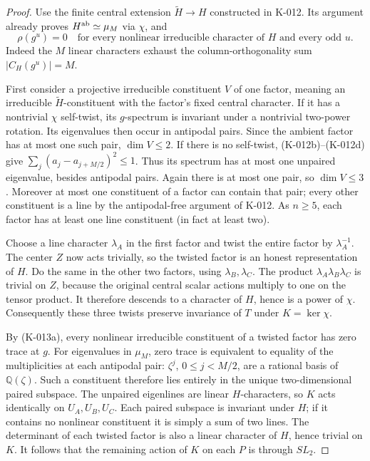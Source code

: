 \begin{proof}
Use the finite central extension $\widetilde H\to H$ constructed in
K-012.  Its argument already proves $H^{\rm ab}\simeq\mu_M$ via
$\chi$, and
\[
 \rho(g^u)=0\quad\text{for every nonlinear irreducible character
 of }H\text{ and every odd }u.                              \tag{K-013a}
\]
Indeed the $M$ linear characters exhaust the column-orthogonality sum
$|C_H(g^u)|=M$.

First consider a projective irreducible constituent $V$ of one factor,
meaning an irreducible $\widetilde H$-constituent with the factor's
fixed central character.  If it has a nontrivial $\chi$ self-twist,
its $g$-spectrum is invariant under a nontrivial two-power rotation.
Its eigenvalues then occur in antipodal pairs.  Since the ambient
factor has at most one such pair, $\dim V\le2$.
If there is no self-twist, (K-012b)--(K-012d) give
$\sum_j(a_j-a_{j+M/2})^2\le1$.  Thus its spectrum has at most one
unpaired eigenvalue, besides antipodal pairs.  Again there is at most
one pair, so $\dim V\le3$.  Moreover at most one constituent of a
factor can contain that pair; every other constituent is a line by
the antipodal-free argument of K-012.  As $n\ge5$, each factor has
at least one line constituent (in fact at least two).

Choose a line character $\lambda_A$ in the first factor and twist the
entire factor by $\lambda_A^{-1}$.  The center $Z$ now acts trivially,
so the twisted factor is an honest representation of $H$.
Do the same in the other two factors, using $\lambda_B,\lambda_C$.
The product $\lambda_A\lambda_B\lambda_C$ is trivial on $Z$,
because the original central scalar actions multiply to one on the
tensor product.  It therefore descends to a character of $H$, hence
is a power of $\chi$.  Consequently these three twists preserve
invariance of $T$ under $K=\ker\chi$.

By (K-013a), every nonlinear irreducible constituent of a twisted
factor has zero trace at $g$.  For eigenvalues in $\mu_M$, zero trace
is equivalent to equality of the multiplicities at each antipodal
pair: $\zeta^j$, $0\le j<M/2$, are a rational basis of
$\mathbb Q(\zeta)$.  Such a constituent therefore lies entirely
in the unique two-dimensional paired subspace.  The unpaired
eigenlines are linear $H$-characters, so $K$ acts identically on
$U_A,U_B,U_C$.  Each paired subspace is invariant under $H$; if it
contains no nonlinear constituent it is simply a sum of two lines.
The determinant of each twisted factor is also a linear character
of $H$, hence trivial on $K$.  It follows that the remaining action
of $K$ on each $P$ is through $SL_2$.


\end{proof}
